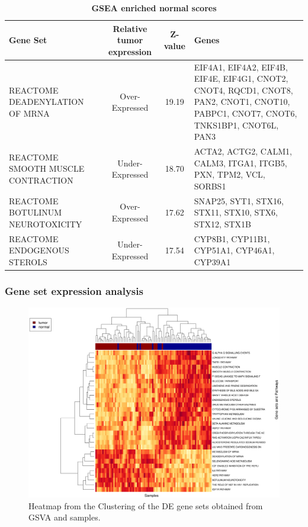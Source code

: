 \documentclass[9pt,twocolumn,twoside]{gsajnl}
\begin{document}
\begin{table}[!h]
\centering
\caption{\bf GSEA enriched normal scores}
\begin{tableminipage}{\textwidth}
\begin{tabular}{|l|c|c|p{3cm}|}
 \hline
Gene Set & Relative tumor expression &  Z-value & Genes \\
  \hline
REACTOME DEADENYLATION OF MRNA & Over-Expressed  & 19.19 & EIF4A1, EIF4A2, EIF4B, EIF4E, EIF4G1, CNOT2, CNOT4, RQCD1, CNOT8, PAN2, CNOT1, CNOT10, PABPC1, CNOT7, CNOT6, TNKS1BP1, CNOT6L, PAN3 \\
REACTOME SMOOTH MUSCLE CONTRACTION & Under-Expressed & 18.70 & ACTA2, ACTG2, CALM1, CALM3, ITGA1, ITGB5, PXN, TPM2, VCL, SORBS1 \\
REACTOME BOTULINUM NEUROTOXICITY & Over-Expressed &  17.62 & SNAP25, SYT1, STX16, STX11, STX10, STX6, STX12, STX1B \\
REACTOME ENDOGENOUS STEROLS & Under-Expressed & 17.54 & CYP8B1, CYP11B1, CYP51A1, CYP46A1, CYP39A1 \\
\hline
\end{tabular}
\label{tab:GSEAenrichment}
\end{tableminipage}
\end{table}


\subsubsection*{Gene set expression analysis}



\begin{figure}[!h]
\centering
\includegraphics[width=\linewidth]{ClusteringGSVA.eps}
\caption{Heatmap from the Clustering of the DE gene sets obtained from GSVA and samples.}
\label{fig:ClusteringGSVA}
\end{figure}
\end{document}
